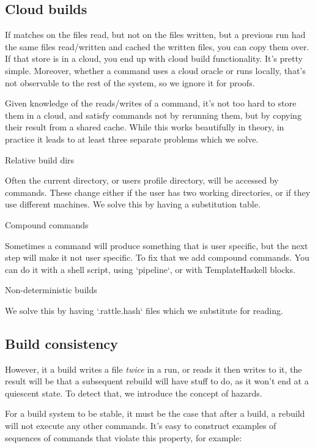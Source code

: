 \subsection{Cloud builds}

If \Rattle matches on the files read, but not on the files written, but a previous run had the same files read/written and cached the written files, you can copy them over. If that store is in a cloud, you end up with cloud build functionality. It's pretty simple. Moreover, whether a command uses a cloud oracle or runs locally, that's not observable to the rest of the system, so we ignore it for proofs.

Given knowledge of the reads/writes of a command, it's not too hard to store them in a cloud, and satisfy commands not by rerunning them, but by copying their result from a shared cache. While this works beautifully in theory, in practice it leads to at least three separate problems which we solve.

Relative build dirs

Often the current directory, or users profile directory, will be accessed by commands. These change either if the user has two working directories, or if they use different machines. We solve this by having a substitution table.

Compound commands

Sometimes a command will produce something that is user specific, but the next step will make it not user specific. To fix that we add compound commands. You can do it with a shell script, using `pipeline`, or with TemplateHaskell blocks.

Non-deterministic builds

We solve this by having `.rattle.hash` files which we substitute for reading.

\subsection{Build consistency}

However, it a build writes a file \emph{twice} in a run, or reads it then writes to it, the result will be that a subsequent rebuild will have stuff to do, as it won't end at a quiescent state. To detect that, we introduce the concept of hazards.

For a \Make build system to be stable, it must be the case that after a build, a rebuild will not execute any other commands. It's easy to construct examples of sequences of commands that violate this property, for example:

